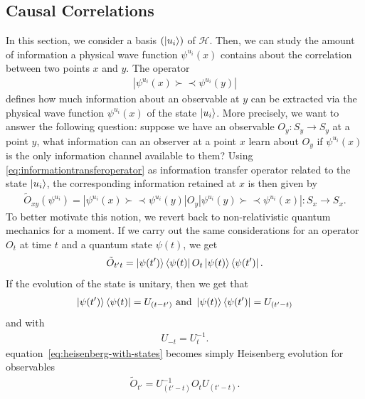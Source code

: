 \documentclass[reqno,11pt]{amsart}
\newcommand{\spinbra}[1]{\left. \prec #1 \right|}
\newcommand{\spinket}[1]{\left| #1 \succ \right.}
\renewcommand{\H}{\mathcal{H}}
\numberwithin{equation}{section}
\begin{document}
% 
\subsection{Causal Correlations}\label{sec:causalcorrelations}

In this section, we consider a basis $\left( \ket{u_i} \right)$ of $\H$.
Then, we can study the amount of information a physical wave function $\psi^{u_i}(x)$ contains about the correlation between
two points $x$ and $y$.
The operator
\begin{align}\label{eq:informationtransferoperator}
    \spinket{\psi^{u_i}(x)} \spinbra{\psi^{u_i}(y)}
\end{align}
defines how much information about an observable at $y$ can be extracted via the physical wave function $\psi^{u_i}(x)$ of the state $\ket{u_i}$.
More precisely, we want to answer the following question: suppose we have an observable $O_y: S_y \to S_y$ at a point $y$,
what information can an observer at a point
$x$ learn about $O_y$ if $\psi^{u_i}(x)$ is the only information channel available to them?
Using \eqref{eq:informationtransferoperator} as information transfer operator related to the state $\ket{u_i}$, the corresponding
information retained at $x$ is then given by
\begin{align}
    \tilde O_{xy}(\psi^{u_i}) = \spinket{\psi^{u_i}(x)} \spinbra{\psi^{u_i}(y)}O_y \spinket{\psi^{u_i}(y)} \spinbra{\psi^{u_i}(x)} : S_x \rightarrow S_x.
\end{align}
To better motivate this notion, we revert back to non-relativistic quantum mechanics for a moment.
If we carry out the same considerations for an operator $O_t$ at time $t$ and a quantum state $\psi(t)$, we get
\begin{align}
    \label{eq:heisenberg-with-states}
    \tilde O_{t't}=   \ket{\psi(t')} \bra{\psi(t)}O_t \ket{\psi(t)} \bra{\psi(t')}.
\end{align}
If the evolution of the state is unitary, then we get that
\begin{align}
    \ket{\psi(t')} \bra{\psi(t)}= U_{(t-t')} \text{ and } \ket{\psi(t)} \bra{\psi(t')}= U_{(t'-t)}
\end{align}
and with
\begin{align}
    U_{-t} = U^{-1}_t.
\end{align}
equation~\eqref{eq:heisenberg-with-states} becomes simply Heisenberg evolution for observables
\begin{align}
    \label{eq:heisenberg-with-operators}
    \tilde O_{t'}= U_{(t'-t)} ^{-1}  O_t U_{(t'-t)} .
\end{align}
\end{document}
